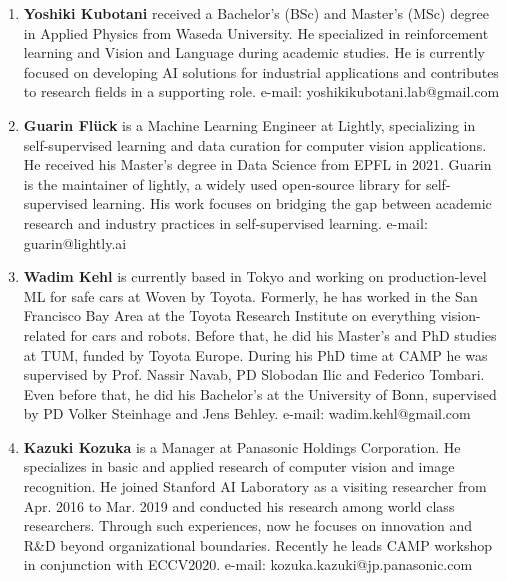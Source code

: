 \documentclass{article}
\begin{document}
\begin{enumerate}
    \item {\bf Yoshiki Kubotani} received a Bachelor's (BSc) and Master's (MSc) degree in Applied Physics from Waseda University. He specialized in reinforcement learning and Vision and Language during academic studies. He is currently focused on developing AI solutions for industrial applications and contributes to research fields in a supporting role.  e-mail: yoshikikubotani.lab@gmail.com

    \item {\bf Guarin Flück} is a Machine Learning Engineer at Lightly, specializing in self-supervised learning and data curation for computer vision applications. He received his Master's degree in Data Science from EPFL in 2021. Guarin is the maintainer of lightly, a widely used open-source library for self-supervised learning. His work focuses on bridging the gap between academic research and industry practices in self-supervised learning. e-mail: guarin@lightly.ai

    \item {\bf Wadim Kehl} is currently based in Tokyo and working on production-level ML for safe cars at Woven by Toyota. Formerly, he has worked in the San Francisco Bay Area at the Toyota Research Institute on everything vision-related for cars and robots. Before that, he did his Master's and PhD studies at TUM, funded by Toyota Europe. During his PhD time at CAMP he was supervised by Prof. Nassir Navab, PD Slobodan Ilic and Federico Tombari. Even before that, he did his Bachelor's at the University of Bonn, supervised by PD Volker Steinhage and Jens Behley. e-mail: wadim.kehl@gmail.com

    \item {\bf Kazuki Kozuka} is a Manager at Panasonic Holdings Corporation. He specializes in basic and applied research of computer vision and image recognition. He joined Stanford AI Laboratory as a visiting researcher from Apr. 2016 to Mar. 2019 and conducted his research among world class researchers. Through such experiences, now he focuses on innovation and R\&D beyond organizational boundaries. Recently he leads CAMP workshop in conjunction with ECCV2020. e-mail: kozuka.kazuki@jp.panasonic.com



\end{enumerate}
\end{document}
